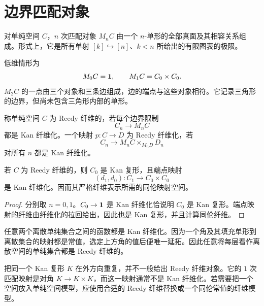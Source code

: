\section{边界匹配对象}
\begin{definition}[匹配对象]
对单纯空间 $C$，$n$ 次匹配对象 $M_nC$ 由一个 $n$-单形的全部真面及其相容关系组成。形式上，它是所有单射 $[k]\hookrightarrow[n]$、$k<n$ 所给出的有限图表的极限。
\end{definition}
\begin{example}
低维情形为
\[
M_0C=\mathbf 1,
\qquad M_1C=C_0\times C_0.
\]
$M_2C$ 的一点由三个对象和三条边组成，边的端点与这些对象相符。它记录三角形的边界，但尚未包含三角形内部的单形。
\end{example}
\begin{definition}
称单纯空间 $C$ 为 Reedy 纤维的，若每个边界限制
\[
C_n\longrightarrow M_nC
\]
都是 Kan 纤维化。一个映射 $p:C\to D$ 为 Reedy 纤维化，若
\[
C_n\longrightarrow M_nC\times_{M_nD}D_n
\]
对所有 $n$ 都是 Kan 纤维化。
\end{definition}
\begin{proposition}
若 $C$ 为 Reedy 纤维的，则 $C_0$ 是 Kan 复形，且端点映射
\[
(d_1,d_0):C_1\to C_0\times C_0
\]
是 Kan 纤维化。因而其严格纤维表示所需的同伦映射空间。
\end{proposition}
\begin{proof}
分别取 $n=0,1$。$C_0\to\mathbf 1$ 是 Kan 纤维化恰说明 $C_0$ 是 Kan 复形。端点映射的纤维由纤维化的拉回给出，因此也是 Kan 复形，并且计算同伦纤维。
\end{proof}
\begin{example}[离散单纯空间]
任意两个离散单纯集合之间的函数都是 Kan 纤维化。因为一个角及其填充单形到离散集合的映射都是常值，选定上方角的值后便唯一延拓。因此任意将每层看作离散空间的单纯集合都是 Reedy 纤维的。
\end{example}
\begin{remark}
把同一个 Kan 复形 $K$ 在外方向重复，并不一般给出 Reedy 纤维对象。它的 $1$ 次匹配映射是对角 $K\to K\times K$，而这一映射通常不是 Kan 纤维化。若需要把一个空间放入单纯空间模型，应使用合适的 Reedy 纤维替换或一个同伦常值的纤维模型。
\end{remark}

